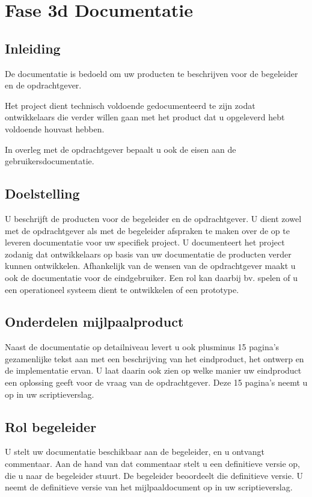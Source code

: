 \section{Fase 3d Documentatie}
\subsection{Inleiding}
De documentatie is bedoeld om uw producten te beschrijven voor
de begeleider en de opdrachtgever.

Het project dient technisch voldoende gedocumenteerd te zijn
zodat ontwikkelaars die verder willen gaan met het product
dat u opgeleverd hebt voldoende houvast hebben.

In overleg met de opdrachtgever bepaalt u ook de eisen aan de gebruikersdocumentatie.

\subsection{Doelstelling}
U beschrijft de producten voor de begeleider en de opdrachtgever. U dient zowel
met de opdrachtgever als met de begeleider afspraken te maken over de op te
leveren documentatie voor uw specifiek project. U documenteert het project
zodanig dat ontwikkelaars op basis van uw documentatie de producten verder
kunnen ontwikkelen. Afhankelijk van de wensen van de opdrachtgever maakt u
ook de documentatie voor de eindgebruiker. Een rol kan daarbij bv. spelen
of u een operationeel systeem dient te ontwikkelen of een prototype.

\subsection{Onderdelen mijlpaalproduct}
Naast de documentatie op detailniveau levert u ook plusminus 15 pagina's
gezamenlijke tekst aan met een beschrijving van het eindproduct, het ontwerp en
de implementatie ervan. U laat daarin ook zien op welke manier uw eindproduct
een oplossing geeft voor de vraag van de opdrachtgever.
Deze 15 pagina's neemt u op in uw scriptieverslag.

\subsection{Rol begeleider}
U stelt uw documentatie beschikbaar aan de begeleider, en u ontvangt commentaar.
Aan de hand van dat commentaar stelt u een definitieve versie op, die u naar de
begeleider stuurt. De begeleider beoordeelt die definitieve versie.
U neemt de definitieve versie van het mijlpaaldocument op in uw scriptieverslag.

